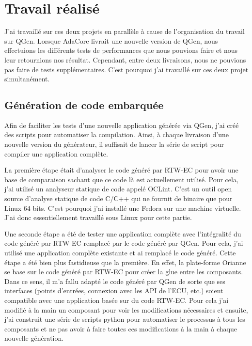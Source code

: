 \chapter{Travail réalisé}
J'ai travaillé sur ces deux projets en parallèle à cause de l'organisation du travail sur QGen.
Lorsque AdaCore livrait une nouvelle version de QGen, nous effectuions les différents tests 
de performances que nous pouvions faire et nous leur retournions nos résultat. Cependant,
entre deux livraisons, nous ne pouvions pas faire de tests supplémentaires. C'est pourquoi
j'ai travaillé sur ces deux projet simultanément.

\section{Génération de code embarquée}
Afin de faciliter les tests d'une nouvelle application générée via QGen, j'ai créé des scripts pour automatiser la compilation.
Ainsi, à chaque livraison d'une nouvelle version du générateur, il suffisait de lancer la série de script pour
compiler une application complète.

La première étape était d'analyser le code généré par RTW-EC\up{\circledR} pour avoir une base de comparaison
sachant que ce code là est actuellement utilisé.
Pour cela, j'ai utilisé un analyseur statique de code appelé OCLint.
C'est un outil open source d'analyse statique de code C/C++ qui ne fournit de binaire que pour Linux 64 bits.
C'est pourquoi j'ai installé une Fedora sur une machine virtuelle. J'ai donc essentiellement travaillé sous Linux pour cette partie.

Une seconde étape a été de tester une application complète avec l'intégralité du code généré par RTW-EC\up{\circledR} remplacé par le code généré par QGen.
Pour cela, j'ai utilisé une application complète existante et ai remplacé le code généré.
Cette étape a été bien plus fastidieuse que la première. En effet, la plate-forme Orianne se base sur le code généré par RTW-EC\up{\circledR} pour créer la \og glue \fg{}
entre les composants. Dans ce sens, il m'a fallu adapté le code généré par QGen de sorte que ses interfaces (points d'entrées, connexion avec les API
de l'ECU, etc.) soient compatible avec une application basée sur du code RTW-EC\up{\circledR}.
Pour cela j'ai modifié à la main un composant pour voir les modifications nécessaires et ensuite, j'ai construit une série de scripts python pour automatiser
le processus à tous les composants et ne pas avoir à faire toutes ces modifications à la main à chaque nouvelle génération.


